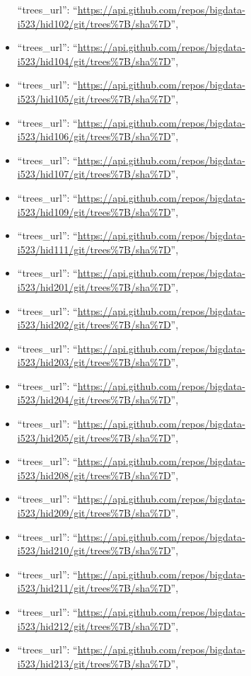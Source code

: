\begin{itemize}
  ``trees\_url'':
  ``\url{https://api.github.com/repos/bigdata-i523/hid102/git/trees\%7B/sha\%7D}'',
\item
  ``trees\_url'':
  ``\url{https://api.github.com/repos/bigdata-i523/hid104/git/trees\%7B/sha\%7D}'',
\item
  ``trees\_url'':
  ``\url{https://api.github.com/repos/bigdata-i523/hid105/git/trees\%7B/sha\%7D}'',
\item
  ``trees\_url'':
  ``\url{https://api.github.com/repos/bigdata-i523/hid106/git/trees\%7B/sha\%7D}'',
\item
  ``trees\_url'':
  ``\url{https://api.github.com/repos/bigdata-i523/hid107/git/trees\%7B/sha\%7D}'',
\item
  ``trees\_url'':
  ``\url{https://api.github.com/repos/bigdata-i523/hid109/git/trees\%7B/sha\%7D}'',
\item
  ``trees\_url'':
  ``\url{https://api.github.com/repos/bigdata-i523/hid111/git/trees\%7B/sha\%7D}'',
\item
  ``trees\_url'':
  ``\url{https://api.github.com/repos/bigdata-i523/hid201/git/trees\%7B/sha\%7D}'',
\item
  ``trees\_url'':
  ``\url{https://api.github.com/repos/bigdata-i523/hid202/git/trees\%7B/sha\%7D}'',
\item
  ``trees\_url'':
  ``\url{https://api.github.com/repos/bigdata-i523/hid203/git/trees\%7B/sha\%7D}'',
\item
  ``trees\_url'':
  ``\url{https://api.github.com/repos/bigdata-i523/hid204/git/trees\%7B/sha\%7D}'',
\item
  ``trees\_url'':
  ``\url{https://api.github.com/repos/bigdata-i523/hid205/git/trees\%7B/sha\%7D}'',
\item
  ``trees\_url'':
  ``\url{https://api.github.com/repos/bigdata-i523/hid208/git/trees\%7B/sha\%7D}'',
\item
  ``trees\_url'':
  ``\url{https://api.github.com/repos/bigdata-i523/hid209/git/trees\%7B/sha\%7D}'',
\item
  ``trees\_url'':
  ``\url{https://api.github.com/repos/bigdata-i523/hid210/git/trees\%7B/sha\%7D}'',
\item
  ``trees\_url'':
  ``\url{https://api.github.com/repos/bigdata-i523/hid211/git/trees\%7B/sha\%7D}'',
\item
  ``trees\_url'':
  ``\url{https://api.github.com/repos/bigdata-i523/hid212/git/trees\%7B/sha\%7D}'',
\item
  ``trees\_url'':
  ``\url{https://api.github.com/repos/bigdata-i523/hid213/git/trees\%7B/sha\%7D}'',

\end{itemize}

